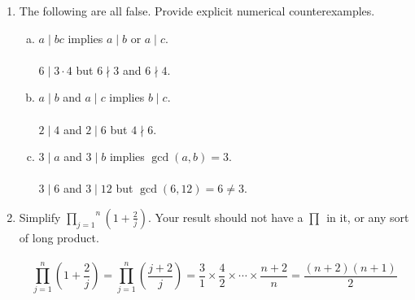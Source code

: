 \documentclass[class=article, crop=false]{standalone}
\def\inlineprod#1#2{\overset{#2}{\underset{#1}{\prod}}}
\begin{document}
\begin{enumerate}[1.]
	\item The following are all false. Provide explicit numerical counterexamples.
	\begin{enumerate}[(a)]
		\item $a\mid bc$ implies $a\mid b$ or $a\mid c$.\\\\
		$6\mid 3\cdot4$ but $6\nmid 3$ and $6\nmid 4$.
		
		\item $a\mid b$ and $a\mid c$ implies $b\mid c$.\\\\
		$2\mid 4$ and $2\mid 6$ but $4\nmid 6$.
		
		\item $3\mid a$ and $3\mid b$ implies $\gcd(a,b)=3$.\\\\
		$3\mid 6$ and $3\mid 12$ but $\gcd(6,12)=6\neq 3$.
	
	\end{enumerate}

	\item Simplify $\inlineprod{j=1}{n} \left(1+\frac{2}{j}\right)$. Your result should not have a 
	$\inlineprod{}{}$ in it, or any sort of long product.\\\\
	$$\prod_{j=1}^{n}\left(1+\frac{2}{j}\right)= \prod_{j=1}^{n}\left(\frac{j+2}{j}\right) = \frac{3}{1}\times\frac{4}{2}\times\cdots\times\frac{n+2}{n} = \frac{(n+2)(n+1)}{2}$$


\end{enumerate}
\end{document}
